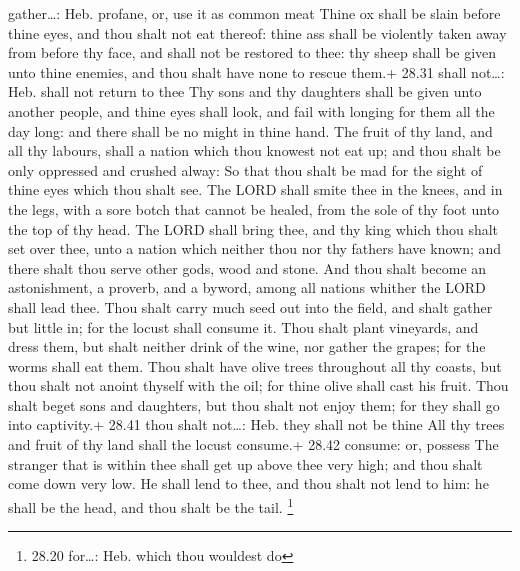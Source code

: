 gather\ldots: Heb. profane, or, use it as common meat 
Thine ox shall be slain before thine eyes, and thou shalt not eat
thereof: thine ass shall be violently taken away from before thy face,
and shall not be restored to thee: thy sheep shall be given unto thine
enemies, and thou shalt have none to rescue them.+ 28.31 shall
not\ldots: Heb. shall not return to thee  Thy sons and thy
daughters shall be given unto another people, and thine eyes shall look,
and fail with longing for them all the day long: and there shall be no
might in thine hand.  The fruit of thy land, and all thy
labours, shall a nation which thou knowest not eat up; and thou shalt be
only oppressed and crushed alway:  So that thou shalt be
mad for the sight of thine eyes which thou shalt see.  The
LORD shall smite thee in the knees, and in the legs, with a sore botch
that cannot be healed, from the sole of thy foot unto the top of thy
head.  The LORD shall bring thee, and thy king which thou
shalt set over thee, unto a nation which neither thou nor thy fathers
have known; and there shalt thou serve other gods, wood and stone.
 And thou shalt become an astonishment, a proverb, and a
byword, among all nations whither the LORD shall lead thee.
 Thou shalt carry much seed out into the field, and shalt
gather but little in; for the locust shall consume it. 
Thou shalt plant vineyards, and dress them, but shalt neither drink of
the wine, nor gather the grapes; for the worms shall eat them.
 Thou shalt have olive trees throughout all thy coasts, but
thou shalt not anoint thyself with the oil; for thine olive shall cast
his fruit.  Thou shalt beget sons and daughters, but thou
shalt not enjoy them; for they shall go into captivity.+ 28.41 thou
shalt not\ldots: Heb. they shall not be thine  All thy
trees and fruit of thy land shall the locust consume.+ 28.42 consume:
or, possess  The stranger that is within thee shall get up
above thee very high; and thou shalt come down very low. 
He shall lend to thee, and thou shalt not lend to him: he shall be the
head, and thou shalt be the tail. \footnote{28.20 for\ldots: Heb. which
  thou wouldest do}

